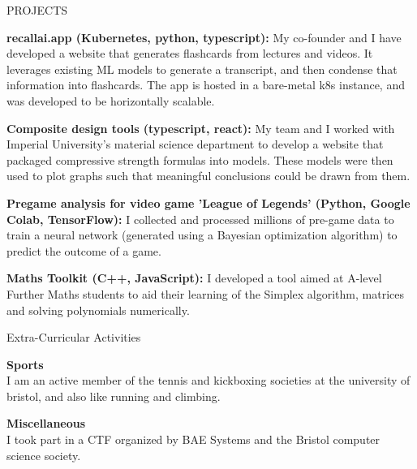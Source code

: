 \documentclass{resume} %
\begin{document}

\begin{rSection}{PROJECTS}
\vspace{-1.25em}

\item \textbf{recallai.app (Kubernetes, python, typescript):} 
{My co-founder and I have developed a website that generates flashcards from lectures and videos. It leverages existing ML models to generate a transcript, and then condense that information into flashcards. The app is hosted in a bare-metal k8s instance, and was developed to be horizontally scalable.}

\item \textbf{Composite design tools (typescript, react):} {My team and I worked with Imperial University's material science department to develop a website that packaged compressive strength formulas into models. These models were then used to plot graphs such that meaningful conclusions could be drawn from them.}

\item \textbf{Pregame analysis for video game 'League of Legends' (Python, Google Colab, TensorFlow):}
{I collected and processed millions of pre-game data to train a neural network (generated using a Bayesian optimization algorithm) to predict the outcome of a game.}%

\item \textbf{Maths Toolkit (C++, JavaScript):} {I developed a tool aimed at A-level Further Maths students to aid their learning of the Simplex algorithm, matrices and solving polynomials numerically.}

\end{rSection}

\begin{rSection}{Extra-Curricular Activities} 
\vspace{-1.25em}

\item{\textbf{Sports}} \\
I am an active member of the tennis and kickboxing societies at the university of bristol, and also like running and climbing. \\

\item{\textbf{Miscellaneous}} \\
I took part in a CTF organized by BAE Systems and the Bristol computer science society. \\



\end{rSection}
\end{document}
